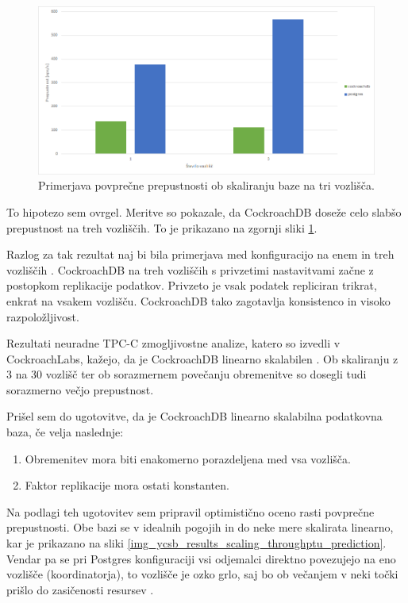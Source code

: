 \documentclass[a4paper, 12pt]{book}
\begin{document}
\begin{figure}[H]
\begin{center}
\includegraphics[width=1\textwidth]{resources/scaling-throughput-v2.png}
\end{center}
\caption{Primerjava povprečne prepustnosti ob skaliranju baze na tri vozlišča.}
\label{img_ycsb_results_scaling_throughptu_comparison}
\end{figure}

To hipotezo sem ovrgel. Meritve so pokazale, da CockroachDB doseže celo slabšo prepustnost na treh vozliščih. To je prikazano na zgornji sliki \ref{img_ycsb_results_scaling_throughptu_comparison}.

Razlog za tak rezultat naj bi bila primerjava med konfiguracijo na enem in treh vozliščih \cite{CRDB-YCSB-perf-analisis}. CockroachDB na treh vozliščih s privzetimi nastavitvami začne z postopkom replikacije podatkov. Privzeto je vsak podatek repliciran trikrat, enkrat na vsakem vozlišču. CockroachDB tako zagotavlja konsistenco in visoko razpoložljivost.

Rezultati neuradne TPC-C zmogljivostne analize, katero so izvedli v CockroachLabs, kažejo, da je CockroachDB linearno skalabilen \cite{CRDB-TPCC-perforamance-report}. Ob skaliranju z 3 na 30 vozlišč ter ob sorazmernem povečanju obremenitve so dosegli tudi sorazmerno večjo prepustnost.

Prišel sem do ugotovitve, da je CockroachDB linearno skalabilna podatkovna baza, če velja naslednje:
\begin{enumerate}
    \item Obremenitev mora biti enakomerno porazdeljena med vsa vozlišča.
    \item Faktor replikacije mora ostati konstanten.
\end{enumerate}

Na podlagi teh ugotovitev sem pripravil optimistično oceno rasti povprečne prepustnosti. Obe bazi se v idealnih pogojih in do neke mere skalirata linearno, kar je prikazano na sliki \ref{img_ycsb_results_scaling_throughptu_prediction}. Vendar pa se pri Postgres konfiguraciji vsi odjemalci direktno povezujejo na eno vozlišče (koordinatorja), to vozlišče je ozko grlo, saj bo ob večanjem v neki točki prišlo do zasičenosti resursev \cite{Citus-add-coordinator}.
\end{document}
